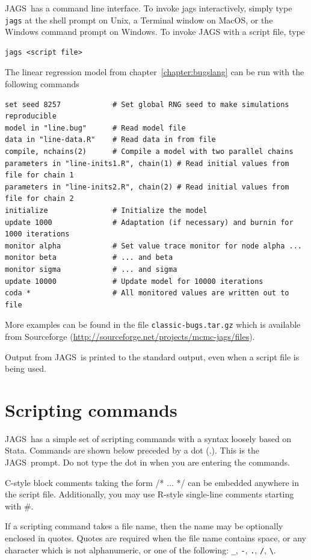 \documentclass[11pt, a4paper, titlepage]{report}
\newcommand{\JAGS}{\textsf{JAGS}}
\newcommand{\R}{\textsf{R}}
\begin{document}
\JAGS\ has a command line interface. To invoke jags interactively,
simply type \texttt{jags} at the shell prompt on Unix, a Terminal
window on MacOS, or the Windows command prompt on Windows. To invoke
JAGS with a script file, type
\begin{verbatim}
jags <script file>
\end{verbatim}
The linear regression model from chapter~\ref{chapter:bugslang} can
be run with the following commands
\begin{verbatim}
set seed 8257            # Set global RNG seed to make simulations reproducible
model in "line.bug"      # Read model file
data in "line-data.R"    # Read data in from file
compile, nchains(2)      # Compile a model with two parallel chains
parameters in "line-inits1.R", chain(1) # Read initial values from file for chain 1
parameters in "line-inits2.R", chain(2) # Read initial values from file for chain 2
initialize               # Initialize the model
update 1000              # Adaptation (if necessary) and burnin for 1000 iterations
monitor alpha            # Set value trace monitor for node alpha ...
monitor beta             # ... and beta
monitor sigma            # ... and sigma
update 10000             # Update model for 10000 iterations
coda *                   # All monitored values are written out to file
\end{verbatim}
More examples can be found in the file \verb+classic-bugs.tar.gz+
which is available from Sourceforge
(\url{http://sourceforge.net/projects/mcmc-jags/files}).

Output from \JAGS\ is printed to the standard output, even when a
script file is being used.  

\section{Scripting commands}
\label{section:scripting}

\JAGS\ has a simple set of scripting commands with a syntax loosely
based on \textsf{Stata}. Commands are shown below preceded by a dot
(.). This is the \JAGS\ prompt. Do not type the dot in when you are
entering the commands.

C-style block comments taking the form /* ... */ can be
embedded anywhere in the script file.  Additionally, you may use
\R-style single-line comments starting with \#.

If a scripting command takes a file name, then the name may be
optionally enclosed in quotes. Quotes are required when the file name
contains space, or any character which is not alphanumeric, or one of
the following: \verb+_+, \verb+-+, \verb+.+, \verb+/+, \verb+\+.
\end{document}
